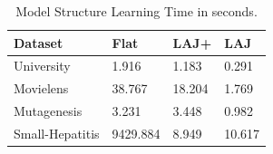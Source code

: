 \documentclass{article}
\begin{document}
\begin{table} \centering
\begin{tabular}[c]
{|l|l|l|l|}\hline
 \textbf{Dataset} & \textbf{Flat} & \textbf{LAJ+} & \textbf{LAJ}\\\hline
University&1.916&1.183&0.291 \\\hline
Movielens &38.767& 18.204& 1.769\\\hline
Mutagenesis &3.231& 3.448& 0.982\\\hline
Small-Hepatitis &9429.884&8.949&10.617 \\\hline
\end{tabular}
\caption{Model Structure Learning Time  in seconds. 
 \label{table:runtimes}}
\end{table}

%
%
%
\end{document}
